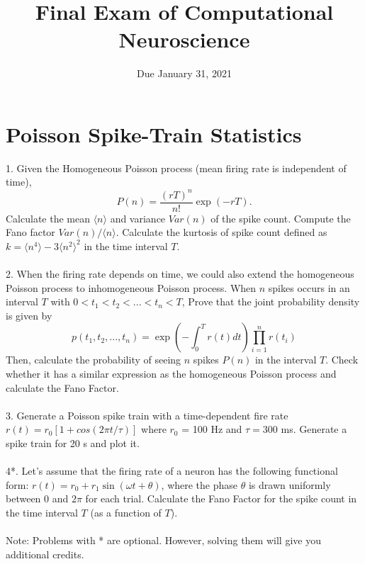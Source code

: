 \documentclass{article}
\title{Final Exam of Computational Neuroscience}
\date{Due January 31, 2021}
\begin{document}
\maketitle

\section*{Poisson Spike-Train Statistics}
1. Given the Homogeneous Poisson process (mean firing rate is independent of time), 
\begin{equation}
P(n)= \frac{(rT)^n}{n!}\exp(-rT).
\end{equation}
Calculate the mean $\langle n \rangle$ and variance $Var(n)$ of the spike count. Compute the Fano factor $Var(n)/\langle n \rangle$. 
Calculate the kurtosis of spike count defined as $k = \langle n^4 \rangle - 3 \langle n^2 \rangle^2$ in the time interval $T$. 
\\
\\
2. When the firing rate depends on time, we could also extend the homogeneous Poisson process to inhomogeneous Poisson process. When $n$ spikes occurs in an interval $T$ with $0<t_1<t_2<...<t_n<T$,  Prove that  the joint probability density is given by 
\begin{equation}
p(t_1,t_2,...,t_n)=\exp\left(-\int_0^Tr(t)dt\right)\prod_{i=1}^{n}r(t_i)
\end{equation}
Then, calculate the probability of seeing $n$ spikes $P(n)$ in the interval $T$. Check whether it has a similar expression as the homogeneous Poisson process and calculate the Fano Factor.
\\
\\
3. Generate a Poisson spike train with a time-dependent fire rate $r(t) = r_0[1 + cos(2\pi t/\tau)]$ where $r_0$ = 100 Hz and $\tau = 300$ ms. Generate a spike train for 20 s and plot it.
\\
\\
4*. Let's assume that the firing rate of a neuron has the following functional form: $r(t)=r_0+r_1\sin(\omega t+\theta)$, where the phase $\theta$  is drawn uniformly between $0$ and $2\pi$ for each trial. Calculate the Fano Factor for the spike count in the time interval $T$ (as a function of $T$).
\\
\\
Note: Problems with * are optional. However, solving them will give you additional credits.
\end{document}
